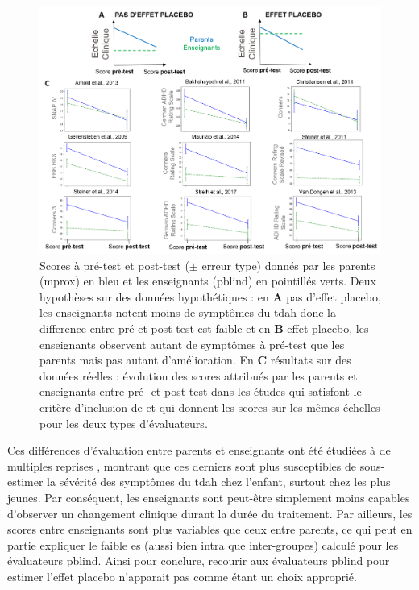 \begin{figure}[h!]
  \centering
	\includegraphics[width=1\linewidth]{figures/chapter-3/factors-pblind-discussion} 
  \caption[Comparaison des scores cliniques attribués aux enfants par les parents et les enseignants à pré et post-test.]{Scores à pré-test et post-test ($\pm$ erreur type) donnés par les parents (\gls{mprox}) en bleu et les enseignants (\gls{pblind}) en pointillés verts. 
	Deux hypothèses sur des données hypothétiques : en \textbf{A} pas d'effet placebo, les enseignants notent moins de symptômes du \gls{tdah} donc la difference entre pré et post-test est faible
	et en \textbf{B} effet placebo, les enseignants observent autant de symptômes à pré-test que les parents mais pas autant d'amélioration. En \textbf{C} résultats sur des données réelles : 
	évolution des scores attribués par les parents et enseignants entre pré- et post-test dans les études qui satisfont le critère d'inclusion de \citeauthor{Cortese2016} 
	et qui donnent les scores sur les mêmes échelles pour les deux types d'évaluateurs.}
  \label{Figure:factors_pblind_discussion}
\end{figure}

Ces différences d'évaluation entre parents et enseignants ont été étudiées à de multiples reprises \citep{Sollie2013, Narad2015, Minder2018}, montrant que 
ces derniers sont plus susceptibles de sous-estimer la sévérité des symptômes du \gls{tdah} chez l'enfant, surtout chez les plus jeunes. Par conséquent, les 
enseignants sont peut-être simplement moins capables d'observer un changement clinique durant la durée du traitement. Par ailleurs, les scores entre enseignants 
sont plus variables que ceux entre parents, ce qui peut en partie expliquer le faible \gls{es} (aussi bien intra que inter-groupes) calculé pour les évaluateurs
\gls{pblind}. Ainsi pour conclure, recourir aux évaluateurs \gls{pblind} pour estimer l'effet placebo n'apparait pas comme étant un choix approprié. 

